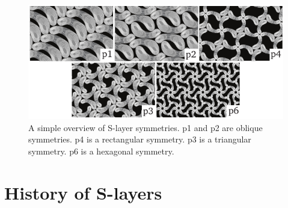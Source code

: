         \begin{figure}[htb] %
                \begin{center}
                    \includegraphics[]{intro/img/symmetries.pdf}
                \end{center}
                \caption[A simple overview of \ac{S-layer} symmetries]{A simple overview of \ac{S-layer} symmetries. p1 and p2 are oblique symmetries. 
                p4 is a rectangular symmetry.  
                p3  is a triangular symmetry. 
                p6 is a hexagonal symmetry.}
        \label{fig:symmetries}
        \end{figure}


    \section{History of S-layers} %
    \label{sec:history_of_s_layers}



